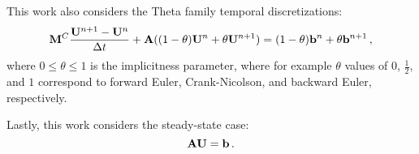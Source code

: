 This work also considers the Theta family temporal discretizations:
\begin{equation}
  \mathbf{M}^C\frac{\mathbf{U}^{n+1}-\mathbf{U}^n}{\Delta t} + \mathbf{A}((1-\theta)\mathbf{U}^n + \theta\mathbf{U}^{n+1})
  = (1-\theta)\mathbf{b}^n + \theta\mathbf{b}^{n+1} \,,
\end{equation}
where $0\leq\theta\leq 1$ is the implicitness parameter, where for example
$\theta$ values of $0$, $\frac{1}{2}$, and $1$ correspond to forward Euler,
Crank-Nicolson, and backward Euler, respectively.

Lastly, this work considers the steady-state case:
\begin{equation}
  \mathbf{A}\mathbf{U} = \mathbf{b} \,.
\end{equation}
